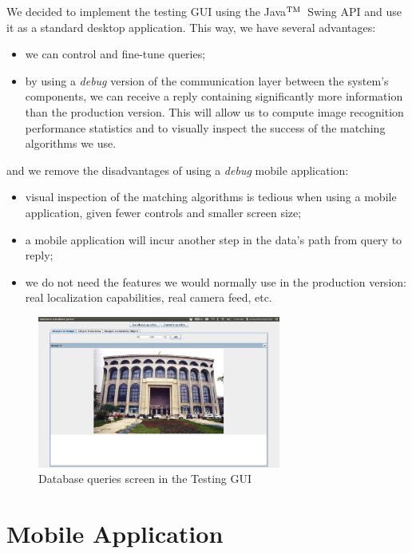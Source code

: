 \documentclass[a4paper,onecolumn,oneside,titlepage,11pt]{report}
\def\tm{\leavevmode\hbox{$\rm {}^{TM}$}}
\begin{document}
We decided to implement the testing GUI using the Java\tm\ Swing API and use it as a standard desktop application. This way, we have several advantages:
\begin{itemize}
	\item we can control and fine-tune queries;
	\item by using a \emph{debug} version of the communication layer between the system's components, we can receive a reply containing significantly more information than the production version. This will allow us to compute image recognition performance statistics and to visually inspect the success of the matching algorithms we use.
\end{itemize}
and we remove the disadvantages of using a \emph{debug} mobile application:
\begin{itemize}
	\item visual inspection of the matching algorithms is tedious when using a mobile application, given fewer controls and smaller screen size;
	\item a mobile application will incur another step in the data's path from query to reply;
	\item we do not need the features we would normally use in the production version: real localization capabilities, real camera feed, etc.
\end{itemize}

\begin{figure}[H]
\begin{center}
\includegraphics[width=8cm]{images/testing_gui_database_queries.png}
\caption{Database queries screen in the Testing GUI}
\end{center}
\end{figure}

\section{Mobile Application}
\end{document}
